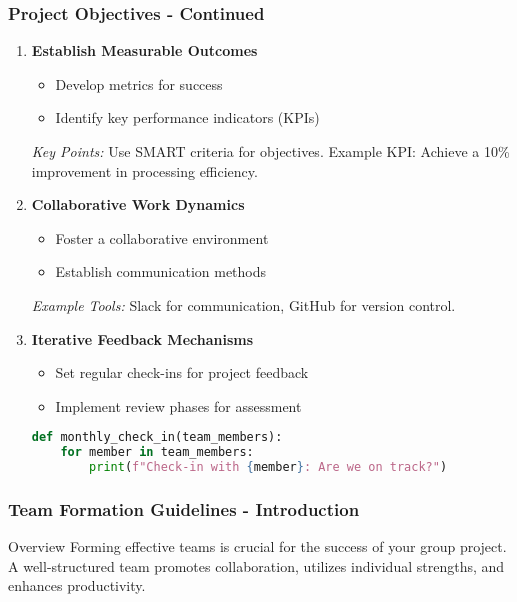 \documentclass[aspectratio=169]{beamer}
\begin{document}
\begin{frame}[fragile]
    \frametitle{Project Objectives - Continued}
    \begin{enumerate}[resume]
        \item \textbf{Establish Measurable Outcomes}
        \begin{itemize}
            \item Develop metrics for success
            \item Identify key performance indicators (KPIs)
        \end{itemize}
        \textit{Key Points:} Use SMART criteria for objectives. Example KPI: Achieve a 10\% improvement in processing efficiency.
        
        \item \textbf{Collaborative Work Dynamics}
        \begin{itemize}
            \item Foster a collaborative environment
            \item Establish communication methods
        \end{itemize}
        \textit{Example Tools:} Slack for communication, GitHub for version control.
        
        \item \textbf{Iterative Feedback Mechanisms}
        \begin{itemize}
            \item Set regular check-ins for project feedback
            \item Implement review phases for assessment
        \end{itemize}
        \begin{lstlisting}[language=Python]
def monthly_check_in(team_members):
    for member in team_members:
        print(f"Check-in with {member}: Are we on track?")
        \end{lstlisting}
    \end{enumerate}
\end{frame}

\begin{frame}[fragile]
    \frametitle{Team Formation Guidelines - Introduction}
    \begin{block}{Overview}
        Forming effective teams is crucial for the success of your group project. 
        A well-structured team promotes collaboration, utilizes individual strengths, and enhances productivity.
    \end{block}
\end{frame}
\end{document}
